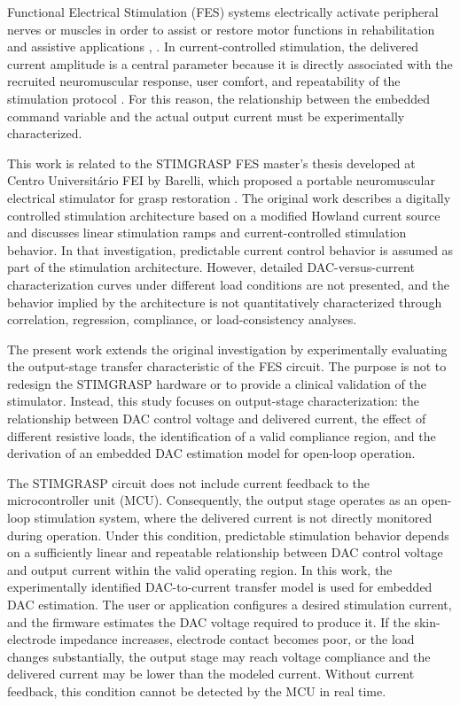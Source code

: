 \documentclass[conference]{IEEEtran}
\begin{document}
Functional Electrical Stimulation (FES) systems electrically activate peripheral nerves or muscles in order to assist or restore motor functions in rehabilitation and assistive applications \cite{FES_REVIEW_1}, \cite{FES_REVIEW_2}. In current-controlled stimulation, the delivered current amplitude is a central parameter because it is directly associated with the recruited neuromuscular response, user comfort, and repeatability of the stimulation protocol \cite{CURRENT_CONTROLLED_STIMULATION}. For this reason, the relationship between the embedded command variable and the actual output current must be experimentally characterized.

This work is related to the STIMGRASP FES master's thesis developed at Centro Universitário FEI by Barelli, which proposed a portable neuromuscular electrical stimulator for grasp restoration \cite{STIMGRASP_THESIS}. The original work describes a digitally controlled stimulation architecture based on a modified Howland current source and discusses linear stimulation ramps and current-controlled stimulation behavior. In that investigation, predictable current control behavior is assumed as part of the stimulation architecture. However, detailed DAC-versus-current characterization curves under different load conditions are not presented, and the behavior implied by the architecture is not quantitatively characterized through correlation, regression, compliance, or load-consistency analyses.

The present work extends the original investigation by experimentally evaluating the output-stage transfer characteristic of the FES circuit. The purpose is not to redesign the STIMGRASP hardware or to provide a clinical validation of the stimulator. Instead, this study focuses on output-stage characterization: the relationship between DAC control voltage and delivered current, the effect of different resistive loads, the identification of a valid compliance region, and the derivation of an embedded DAC estimation model for open-loop operation.

The STIMGRASP circuit does not include current feedback to the microcontroller unit (MCU). Consequently, the output stage operates as an open-loop stimulation system, where the delivered current is not directly monitored during operation. Under this condition, predictable stimulation behavior depends on a sufficiently linear and repeatable relationship between DAC control voltage and output current within the valid operating region. In this work, the experimentally identified DAC-to-current transfer model is used for embedded DAC estimation. The user or application configures a desired stimulation current, and the firmware estimates the DAC voltage required to produce it. If the skin-electrode impedance increases, electrode contact becomes poor, or the load changes substantially, the output stage may reach voltage compliance and the delivered current may be lower than the modeled current. Without current feedback, this condition cannot be detected by the MCU in real time.
\end{document}
